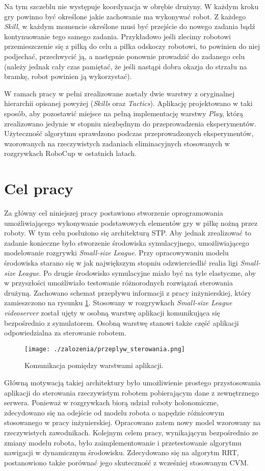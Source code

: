 \begin{enumerate}
  Na tym szczeblu nie występuje koordynacja w obrębie drużyny. W każdym kroku gry powinno być określone jakie zachowanie ma wykonywać robot. Z każdego \textit{Skill}, w każdym momencie określone musi być przejście
  do nowego zadania bądź kontynuowanie tego samego zadania. Przykładowo jeśli zlecimy robotowi przemieszczenie się z piłką do celu a piłka 
  odskoczy robotowi, to powinien do niej podjechać, przechwycić ją, a następnie ponownie prowadzić do zadanego celu (należy jednak cały czas pamiętać, że jeśli nastąpi dobra okazja do strzału
na bramkę, robot powinien ją wykorzystać).
\end{enumerate}

 W ramach pracy w pełni zrealizowane zostały dwie warstwy z oryginalnej hierarchii opisanej powyżej (\textit{Skills} oraz \textit{Tactics}). Aplikację projektowano w taki sposób, aby pozostawić miejsce
 na pełną implementację warstwy \textit{Play}, którą zrealizowano jedynie w stopniu niezbędnym do przeprowadzenia eksperymentów.
Użyteczność algorytmu sprawdzono podczas przeprowadzonych eksperymentów, wzorowanych na rzeczywistych zadaniach eliminacyjnych stosowanych w rozgrywkach RoboCup w ostatnich latach.

\section{Cel pracy}
Za główny cel niniejszej pracy postawiono stworzenie oprogramowania umożliwiającego wykonywanie podstawowych elementów gry w piłkę nożną przez roboty. W tym celu posłużono się architekturą STP. Aby jednak zrealizować to zadanie konieczne było
stworzenie środowiska symulacyjnego, umożliwiającego modelowanie rozgrywki \emph{Small-size League}. Przy opracowywaniu modelu środowiska starano się w jak największym stopniu odzwierciedlić realia
ligi \emph{Small-size League}. Po drugie środowisko symulacyjne miało być na tyle elastyczne, aby w przyszłości umożliwiało testowanie różnorodnych rozwiązań sterowania drużyną.
Zachowano schemat przepływu informacji z pracy inżynierskiej, który zamieszczono na rysunku \ref{fig:przeplyw_sterowania}. Stosowany w rozgrywkach \emph{Small-size League} \textit{videoserver} został
ujęty w osobną warstwę  aplikacji komunikująca się bezpośrednio z symulatorem. Osobną warstwę stanowi także część aplikacji odpowiedzialna za sterowanie robotem.
\begin{figure}[H]
\centering
\texttt{[image: ./zalozenia/przeplyw\_sterowania.png]}
\caption{Komunikacja pomiędzy warstwami aplikacji.} \label{fig:przeplyw_sterowania}
\end{figure}
Główną motywacją takiej architektury było umożliwienie prostego przystosowania aplikacji do sterowania rzeczywistym robotem pobierającym dane z zewnętrznego serwera. 
Ponieważ w rozgrywkach biorą udział roboty holonomiczne, zdecydowano się na odejście od modelu robota o napędzie różnicowym stosowanego w pracy inżynierskiej. Opracowano zatem nowy model wzorowany na rzeczywistych
zawodnikach.
Kolejnym celem pracy, wynikającym bezpośrednio ze zmiany modelu robota, było zaimplementowanie i przetestowanie algorytmu nawigacji w dynamicznym środowisku. Zdecydowano się na algorytm RRT,
postanowiono także porównać jego skuteczność z wcześniej stosowanym CVM.

